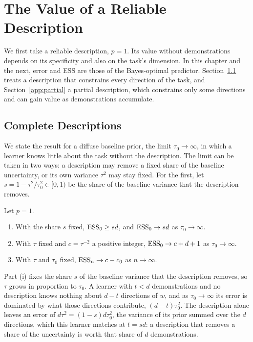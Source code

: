 \chapter{The Value of a Reliable Description}\label{ch:specificity}

We first take a reliable description, $p=1$. Its value without demonstrations depends on its specificity and also on the task's dimension. In this chapter and the next, error and ESS are those of the Bayes-optimal predictor. Section~\ref{app:specificity} treats a description that constrains every direction of the task, and Section~\ref{app:partial} a partial description, which constrains only some directions and can gain value as demonstrations accumulate.

\section{Complete Descriptions}\label{app:specificity}

We state the result for a diffuse baseline prior, the limit $\tau_0\to\infty$, in which a learner knows little about the task without the description. The limit can be taken in two ways: a description may remove a fixed share of the baseline uncertainty, or its own variance $\tau^2$ may stay fixed. For the first, let $s=1-\tau^2/\tau_0^2\in[0,1)$ be the share of the baseline variance that the description removes.

\begin{proposition}\label{prop:reliable}
Let $p=1$.
\begin{enumerate}[label=(\roman*),nosep,leftmargin=*]
\item With the share $s$ fixed, $\mathrm{ESS}_0\geq sd$, and $\mathrm{ESS}_0\to sd$ as $\tau_0\to\infty$.
\item With $\tau$ fixed and $c=\tau^{-2}$ a positive integer, $\mathrm{ESS}_0\to c+d+1$ as $\tau_0\to\infty$.
\item With $\tau$ and $\tau_0$ fixed, $\mathrm{ESS}_n\to c-c_0$ as $n\to\infty$.
\end{enumerate}
\end{proposition}

Part (i) fixes the share $s$ of the baseline variance that the description removes, so $\tau$ grows in proportion to $\tau_0$. A learner with $t<d$ demonstrations and no description knows nothing about $d-t$ directions of $w$, and as $\tau_0\to\infty$ its error is dominated by what those directions contribute, $(d-t)\tau_0^2$. The description alone leaves an error of $d\tau^2=(1-s)d\tau_0^2$, the variance of its prior summed over the $d$ directions, which this learner matches at $t=sd$: a description that removes a share of the uncertainty is worth that share of $d$ demonstrations.

